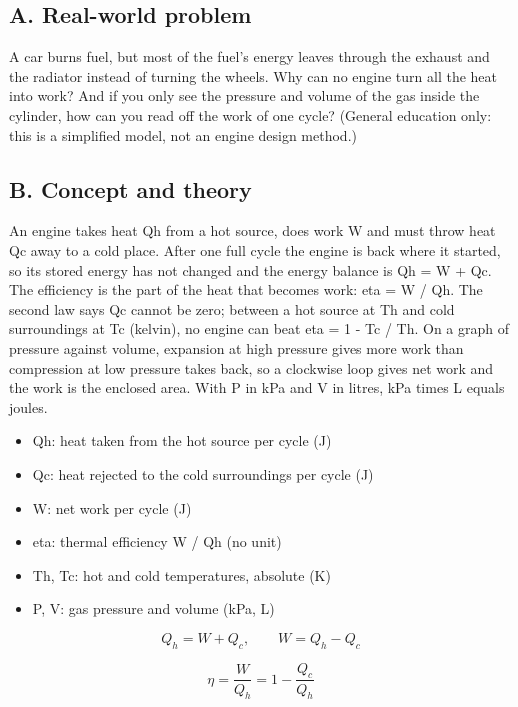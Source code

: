 \documentclass[11pt,a4paper]{article}
\begin{document}
\subsection*{A. Real-world problem}
A car burns fuel, but most of the fuel's energy leaves through the exhaust and the radiator instead of turning the wheels. Why can no engine turn all the heat into work? And if you only see the pressure and volume of the gas inside the cylinder, how can you read off the work of one cycle? (General education only: this is a simplified model, not an engine design method.)

\subsection*{B. Concept and theory}
An engine takes heat Qh from a hot source, does work W and must throw heat Qc away to a cold place. After one full cycle the engine is back where it started, so its stored energy has not changed and the energy balance is Qh = W + Qc. The efficiency is the part of the heat that becomes work: eta = W / Qh. The second law says Qc cannot be zero; between a hot source at Th and cold surroundings at Tc (kelvin), no engine can beat eta = 1 - Tc / Th. On a graph of pressure against volume, expansion at high pressure gives more work than compression at low pressure takes back, so a clockwise loop gives net work and the work is the enclosed area. With P in kPa and V in litres, kPa times L equals joules.

\begin{itemize}[nosep]
\item Qh: heat taken from the hot source per cycle (J)
\item Qc: heat rejected to the cold surroundings per cycle (J)
\item W: net work per cycle (J)
\item eta: thermal efficiency W / Qh (no unit)
\item Th, Tc: hot and cold temperatures, absolute (K)
\item P, V: gas pressure and volume (kPa, L)
\end{itemize}

\begin{equation*}
Q_h = W + Q_c,\qquad W = Q_h - Q_c
\end{equation*}

\begin{equation*}
\eta = \frac{W}{Q_h} = 1 - \frac{Q_c}{Q_h}
\end{equation*}
\end{document}
